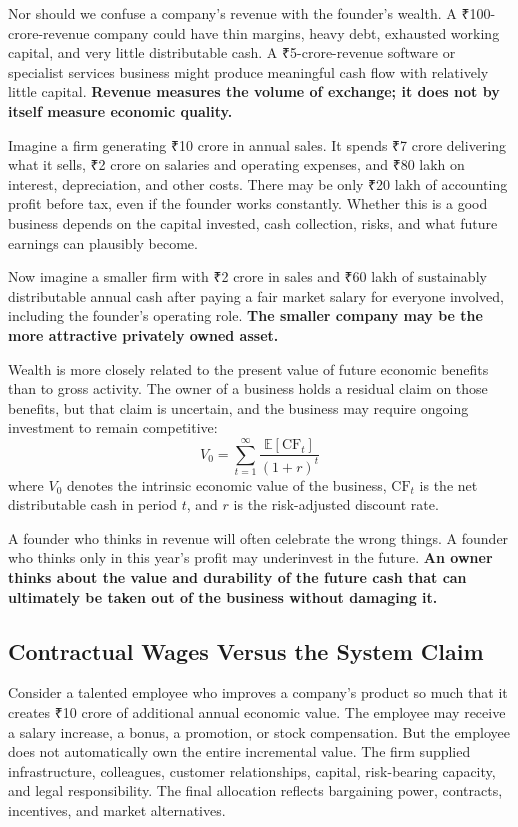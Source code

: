 Nor should we confuse a company's revenue with the founder's wealth. A ₹100-crore-revenue company could have thin margins, heavy debt, exhausted working capital, and very little distributable cash. A ₹5-crore-revenue software or specialist services business might produce meaningful cash flow with relatively little capital. \textbf{Revenue measures the volume of exchange; it does not by itself measure economic quality.}

Imagine a firm generating ₹10 crore in annual sales. It spends ₹7 crore delivering what it sells, ₹2 crore on salaries and operating expenses, and ₹80 lakh on interest, depreciation, and other costs. There may be only ₹20 lakh of accounting profit before tax, even if the founder works constantly. Whether this is a good business depends on the capital invested, cash collection, risks, and what future earnings can plausibly become.

Now imagine a smaller firm with ₹2 crore in sales and ₹60 lakh of sustainably distributable annual cash after paying a fair market salary for everyone involved, including the founder's operating role. \textbf{The smaller company may be the more attractive privately owned asset.}

Wealth is more closely related to the present value of future economic benefits than to gross activity. The owner of a business holds a residual claim on those benefits, but that claim is uncertain, and the business may require ongoing investment to remain competitive:
\begin{equation}
  V_0 = \sum_{t=1}^{\infty} \frac{\mathbb{E}[\text{CF}_t]}{(1 + r)^t} \label{eq:present-value}
\end{equation}
where $V_0$ denotes the intrinsic economic value of the business, $\text{CF}_t$ is the net distributable cash in period $t$, and $r$ is the risk-adjusted discount rate.

A founder who thinks in revenue will often celebrate the wrong things. A founder who thinks only in this year's profit may underinvest in the future. \textbf{An owner thinks about the value and durability of the future cash that can ultimately be taken out of the business without damaging it.}

\subsection{Contractual Wages Versus the System Claim}

Consider a talented employee who improves a company's product so much that it creates ₹10 crore of additional annual economic value. The employee may receive a salary increase, a bonus, a promotion, or stock compensation. But the employee does not automatically own the entire incremental value. The firm supplied infrastructure, colleagues, customer relationships, capital, risk-bearing capacity, and legal responsibility. The final allocation reflects bargaining power, contracts, incentives, and market alternatives.

